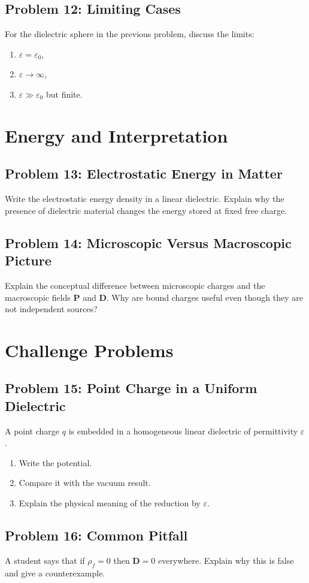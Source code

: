 \documentclass[hidelinks]{article}
\begin{document}
\subsection{Problem 12: Limiting Cases}
For the dielectric sphere in the previous problem, discuss the limits:
\begin{enumerate}[label=\alph*)]
\item $\varepsilon=\varepsilon_0$,
\item $\varepsilon\to \infty$,
\item $\varepsilon \gg \varepsilon_0$ but finite.
\end{enumerate}

\section{Energy and Interpretation}
\subsection{Problem 13: Electrostatic Energy in Matter}
Write the electrostatic energy density in a linear dielectric. Explain why the presence of dielectric material changes the energy stored at fixed free charge.

\subsection{Problem 14: Microscopic Versus Macroscopic Picture}
Explain the conceptual difference between microscopic charges and the macroscopic fields $\mathbf{P}$ and $\mathbf{D}$. Why are bound charges useful even though they are not independent sources?

\section{Challenge Problems}
\subsection{Problem 15: Point Charge in a Uniform Dielectric}
A point charge $q$ is embedded in a homogeneous linear dielectric of permittivity $\varepsilon$.
\begin{enumerate}[label=\alph*)]
\item Write the potential.
\item Compare it with the vacuum result.
\item Explain the physical meaning of the reduction by $\varepsilon$.
\end{enumerate}

\subsection{Problem 16: Common Pitfall}
A student says that if $\rho_f=0$ then $\mathbf{D}=0$ everywhere. Explain why this is false and give a counterexample.
\end{document}
